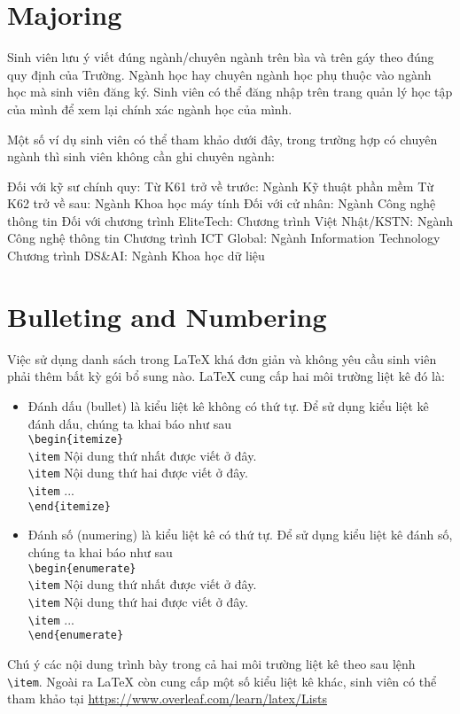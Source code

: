 \documentclass[../Main.tex]{subfiles}
\begin{document}
\section{Majoring}
Sinh viên lưu ý viết đúng ngành/chuyên ngành trên bìa và trên gáy theo đúng quy định của Trường. Ngành học hay chuyên ngành học phụ thuộc vào ngành học mà sinh viên đăng ký. Sinh viên có thể đăng nhập trên trang quản lý học tập của mình để xem lại chính xác ngành học của mình. 

Một số ví dụ sinh viên có thể tham khảo dưới đây, trong trường hợp có chuyên ngành thì sinh viên không cần ghi chuyên ngành:

\begin{outline}
 \1 Đối với kỹ sư chính quy:
   \2 Từ K61 trở về trước: Ngành Kỹ thuật phần mềm
   \2 Từ K62 trở về sau: Ngành Khoa học máy tính
 \1 Đối với cử nhân:
   \2 Ngành Công nghệ thông tin
 \1 Đối với chương trình EliteTech:
   \2 Chương trình Việt Nhật/KSTN: Ngành Công nghệ thông tin
   \2 Chương trình ICT Global: Ngành Information Technology
   \2 Chương trình DS\&AI: Ngành Khoa học dữ liệu
\end{outline}

\section{Bulleting and Numbering}
Việc sử dụng danh sách trong LaTeX khá đơn giản và không yêu cầu sinh viên phải thêm bất kỳ gói bổ sung nào. LaTeX cung cấp hai môi trường liệt kê đó là:
\begin{itemize}
\item Đánh dấu (bullet) là kiểu liệt kê không có thứ tự. Để sử dụng kiểu liệt kê đánh dấu, chúng ta khai báo như sau\\ 
\verb$\begin{itemize}$\\
 \verb$\item$ Nội dung thứ nhất được viết ở đây.\\
\verb$\item$ Nội dung thứ hai được viết ở đây.\\
 \verb$\item$ ...\\
\verb$\end{itemize}$
\item Đánh số (numering) là kiểu liệt kê có thứ tự. Để sử dụng kiểu liệt kê đánh số, chúng ta khai báo như sau\\
\verb$\begin{enumerate}$\\
 \verb$\item$ Nội dung thứ nhất được viết ở đây.\\
\verb$\item$ Nội dung thứ hai được viết ở đây.\\
 \verb$\item$ ...\\
\verb$\end{enumerate}$
\end{itemize}
Chú ý các nội dung trình bày trong cả hai môi trường liệt kê theo sau lệnh \verb$\item$. Ngoài ra LaTeX còn cung cấp một số kiểu liệt kê khác, sinh viên có thể tham khảo tại \url{https://www.overleaf.com/learn/latex/Lists}
\end{document}
